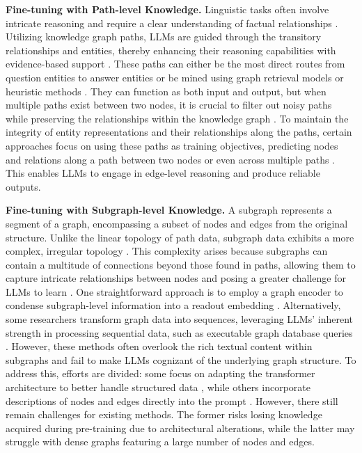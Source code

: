 \documentclass[lettersize,journal]{IEEEtran}
\begin{document}
\noindent\textbf{Fine-tuning with Path-level Knowledge.}
Linguistic tasks often involve intricate reasoning and require a clear understanding of factual relationships \cite{bianchini2024enhancing}. Utilizing knowledge graph paths, LLMs are guided through the transitory relationships and entities, thereby enhancing their reasoning capabilities with evidence-based support \cite{shu2024knowledge}. These paths can either be the most direct routes from question entities to answer entities or be mined using graph retrieval models \cite{mavromatis2024gnn} or heuristic methods \cite{tan2024musegraph}. They can function as both input and output, but when multiple paths exist between two nodes, it is crucial to filter out noisy paths while preserving the relationships within the knowledge graph \cite{wu2024exploring}. To maintain the integrity of entity representations and their relationships along the paths, certain approaches focus on using these paths as training objectives, predicting nodes and relations along a path between two nodes \cite{zhang2023structure} or even across multiple paths \cite{luo2024reasoning}. This enables LLMs to engage in edge-level reasoning and produce reliable outputs.


\noindent\textbf{Fine-tuning with Subgraph-level Knowledge.}
A subgraph represents a segment of a graph, encompassing a subset of nodes and edges from the original structure. Unlike the linear topology of path data, subgraph data exhibits a more complex, irregular topology \cite{tang2023graphgpt}. This complexity arises because subgraphs can contain a multitude of connections beyond those found in paths, allowing them to capture intricate relationships between nodes and posing a greater challenge for LLMs to learn \cite{chen2024graphwiz,chen2024llaga}. One straightforward approach is to employ a graph encoder to condense subgraph-level information into a readout embedding \cite{he2024g, tian2024graph}. Alternatively, some researchers transform graph data into sequences, leveraging LLMs' inherent strength in processing sequential data, such as executable graph database queries \cite{luo2023chatkbqa}. However, these methods often overlook the rich textual content within subgraphs and fail to make LLMs cognizant of the underlying graph structure.
To address this, efforts are divided: some focus on adapting the transformer architecture to better handle structured data \cite{ji2023rho, yan2024enhancing, yuan2024gnnavi}, while others incorporate descriptions of nodes and edges directly into the prompt \cite{ye2024language, chenllaga}. However, there still remain challenges for existing methods. The former risks losing knowledge acquired during pre-training due to architectural alterations, while the latter may struggle with dense graphs featuring a large number of nodes and edges.
\end{document}
